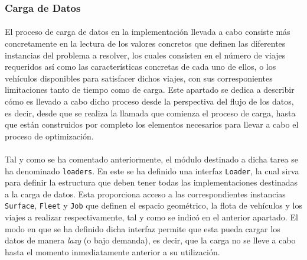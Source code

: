 \documentclass{subfiles}
\begin{document}
        \subsubsection{Carga de Datos}
        \label{sec:implementation_components_data_loading}

          \paragraph{}
          El proceso de carga de datos en la implementación llevada a cabo consiste más concretamente en la lectura de los valores concretos que definen las diferentes instancias del problema a resolver, los cuales consisten en el número de viajes requeridos así como las características concretas de cada uno de ellos, o los vehículos disponibles para satisfacer dichos viajes, con sus corresponientes limitaciones tanto de tiempo como de carga. Este apartado se dedica a describir cómo es llevado a cabo dicho proceso desde la perspectiva del flujo de los datos, es decir, desde que se realiza la llamada que comienza el proceso de carga, hasta que están construidos por completo los elementos necesarios para llevar a cabo el proceso de optimización.

          \paragraph{}
          Tal y como se ha comentado anteriormente, el módulo destinado a dicha tarea se ha denominado \texttt{loaders}. En este se ha definido una interfaz \texttt{Loader}, la cual sirva para definir la estructura que deben tener todas las implementaciones destinadas a la carga de datos. Esta proporciona acceso a las correspondientes instancias \texttt{Surface}, \texttt{Fleet} y \texttt{Job} que definen el espacio geométrico, la flota de vehículos y los viajes a realizar respectivamente, tal y como se indicó en el anterior apartado. El modo en que se ha definido dicha interfaz permite que esta pueda cargar los datos de manera \emph{lazy} (o bajo demanda), es decir, que la carga no se lleve a cabo hasta el momento inmediatamente anterior a su utilización.
\end{document}
